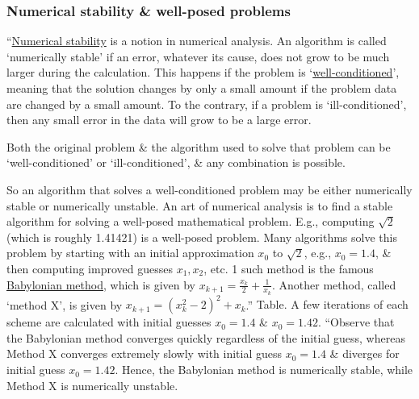 \documentclass[oneside]{book}
\numberwithin{equation}{section}
\begin{document}
\subsubsection{Numerical stability \& well-posed problems}
``\href{https://en.wikipedia.org/wiki/Numerical_stability}{Numerical stability} is a notion in numerical analysis. An algorithm is called `numerically stable' if an error, whatever its cause, does not grow to be much larger during the calculation. This happens if the problem is `\href{https://en.wikipedia.org/wiki/Condition_number}{well-conditioned}', meaning that the solution changes by only a small amount if the problem data are changed by a small amount. To the contrary, if a problem is `ill-conditioned', then any small error in the data will grow to be a large error.

Both the original problem \& the algorithm used to solve that problem can be `well-conditioned' or `ill-conditioned', \& any combination is possible.

So an algorithm that solves a well-conditioned problem may be either numerically stable or numerically unstable. An art of numerical analysis is to find a stable algorithm for solving a well-posed mathematical problem. E.g., computing $\sqrt{2}$ (which is roughly 1.41421) is a well-posed problem. Many algorithms solve this problem by starting with an initial approximation $x_0$ to $\sqrt{2}$, e.g., $x_0 = 1.4$, \& then computing improved guesses $x_1,x_2$, etc. 1 such method is the famous \href{https://en.wikipedia.org/wiki/Babylonian_method}{Babylonian method}, which is given by $x_{k+1} = \frac{x_k}{2} + \frac{1}{x_k}$. Another method, called `method X', is given by $x_{k+1} = (x_k^2 - 2)^2 + x_k$.'' \textsf{Table. A few iterations of each scheme are calculated with initial guesses $x_0 = 1.4$ \& $x_0 = 1.42$.} ``Observe that the Babylonian method converges quickly regardless of the initial guess, whereas Method X converges extremely slowly with initial guess $x_0 = 1.4$ \& diverges for initial guess $x_0 = 1.42$. Hence, the Babylonian method is numerically stable, while Method X is numerically unstable.
\end{document}
